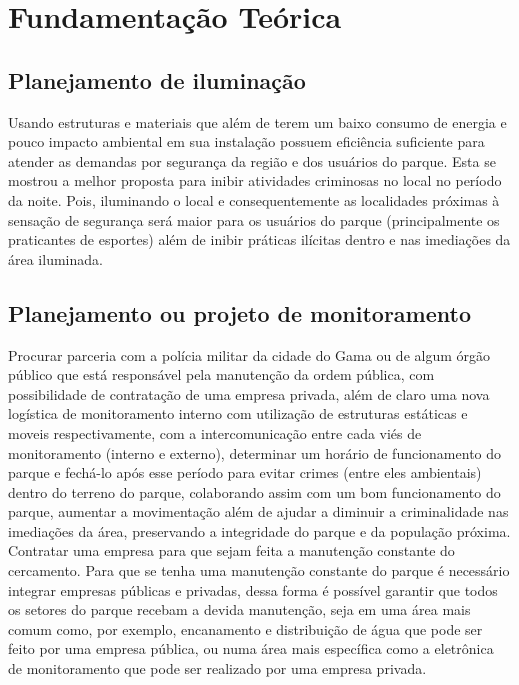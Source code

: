 \section{Fundamenta\c{c}\~ao Te\'orica}

\subsection{Planejamento de ilumina\c{c}\~ao}

Usando estruturas e materiais que al\'em de terem um baixo consumo de energia e pouco impacto ambiental em sua instala\c{c}\~ao possuem efici\^encia suficiente para atender as demandas por seguran\c{c}a da regi\~ao e dos usu\'arios do parque. Esta se mostrou a melhor proposta para  inibir atividades criminosas no local no per\'iodo da noite. Pois, iluminando o local e consequentemente as localidades pr\'oximas \`a sensa\c{c}\~ao de seguran\c{c}a ser\'a maior para os usu\'arios do parque (principalmente os praticantes de esportes) al\'em de inibir pr\'aticas il\'icitas dentro e nas imedia\c{c}\~oes da \'area iluminada.

\subsection{Planejamento ou projeto de monitoramento}

Procurar parceria com a pol\'icia militar da cidade do Gama ou de algum \'org\~ao p\'ublico que est\'a respons\'avel pela manuten\c{c}\~ao da ordem p\'ublica, com possibilidade de contrata\c{c}\~ao de uma empresa privada, al\'em de claro uma nova log\'istica de monitoramento interno com utiliza\c{c}\~ao de estruturas est\'aticas e moveis respectivamente, com a intercomunica\c{c}\~ao entre cada vi\'es de monitoramento (interno e externo), determinar um hor\'ario de funcionamento do parque e fech\'a-lo ap\'os esse per\'iodo para evitar crimes (entre eles ambientais) dentro do terreno do parque, colaborando assim com um bom funcionamento do parque, aumentar a movimenta\c{c}\~ao al\'em de ajudar a diminuir a criminalidade nas imedia\c{c}\~oes da \'area, preservando a integridade do parque e da popula\c{c}\~ao pr\'oxima. Contratar uma empresa para que sejam feita a manuten\c{c}\~ao constante do cercamento. Para que se tenha uma manuten\c{c}\~ao constante do parque \'e necess\'ario integrar empresas p\'ublicas e privadas, dessa forma \'e poss\'ivel garantir que todos os setores do parque recebam a devida manuten\c{c}\~ao, seja em uma \'area mais comum como, por exemplo, encanamento e distribui\c{c}\~ao de \'agua que pode ser feito por uma empresa p\'ublica, ou numa \'area mais espec\'ifica como a eletr\^onica de monitoramento que pode ser realizado por uma empresa privada.
	
